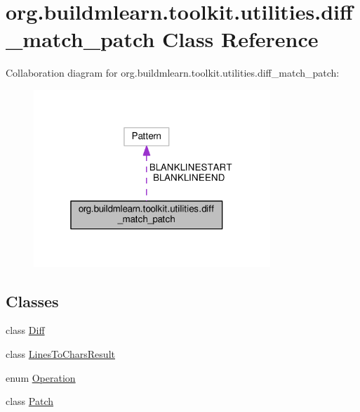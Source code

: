 \hypertarget{classorg_1_1buildmlearn_1_1toolkit_1_1utilities_1_1diff__match__patch}{}\section{org.\+buildmlearn.\+toolkit.\+utilities.\+diff\+\_\+match\+\_\+patch Class Reference}
\label{classorg_1_1buildmlearn_1_1toolkit_1_1utilities_1_1diff__match__patch}


Collaboration diagram for org.\+buildmlearn.\+toolkit.\+utilities.\+diff\+\_\+match\+\_\+patch\+:
\nopagebreak
\begin{figure}[H]
\begin{center}
\leavevmode
\includegraphics[width=253pt]{classorg_1_1buildmlearn_1_1toolkit_1_1utilities_1_1diff__match__patch__coll__graph}
\end{center}
\end{figure}
\subsection*{Classes}
\begin{DoxyCompactItemize}
\item 
class \hyperlink{classorg_1_1buildmlearn_1_1toolkit_1_1utilities_1_1diff__match__patch_1_1Diff}{Diff}
\item 
class \hyperlink{classorg_1_1buildmlearn_1_1toolkit_1_1utilities_1_1diff__match__patch_1_1LinesToCharsResult}{Lines\+To\+Chars\+Result}
\item 
enum \hyperlink{enumorg_1_1buildmlearn_1_1toolkit_1_1utilities_1_1diff__match__patch_1_1Operation}{Operation}
\item 
class \hyperlink{classorg_1_1buildmlearn_1_1toolkit_1_1utilities_1_1diff__match__patch_1_1Patch}{Patch}
\end{DoxyCompactItemize}
